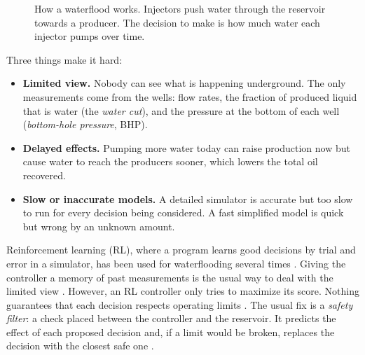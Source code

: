 \documentclass[11pt,letterpaper]{article}
\begin{document}
\begin{figure}[!htbp]
\caption[Conceptual waterflood]{How a waterflood works. Injectors push water through the reservoir towards a
producer. The decision to make is how much water each injector pumps over time.}
\label{fig:waterflood}
\end{figure}

Three things make it hard:
\begin{itemize}
\item \textbf{Limited view.} Nobody can see what is happening underground. The only
measurements come from the wells: flow rates, the fraction of produced liquid that is water
(the \emph{water cut}), and the pressure at the bottom of each well (\emph{bottom-hole
pressure}, BHP).
\item \textbf{Delayed effects.} Pumping more water today can raise production now but cause
water to reach the producers sooner, which lowers the total oil recovered.
\item \textbf{Slow or inaccurate models.} A detailed simulator is accurate but too slow to
run for every decision being considered. A fast simplified model is quick but wrong by an
unknown amount.
\end{itemize}

Reinforcement learning (RL), where a program learns good decisions by trial and error in a
simulator, has been used for waterflooding several times
\cite{hourfar2019rl,ma2019drl,zhang2022drl}. Giving the controller a memory of past
measurements is the usual way to deal with the limited view
\cite{kaelbling1998pomdp,hausknecht2015drqn}. However, an RL controller only tries to
maximize its score. Nothing guarantees that each decision respects operating limits
\cite{garcia2015survey}. The usual fix is a \emph{safety filter}: a check placed between
the controller and the reservoir. It predicts the effect of each proposed decision and, if
a limit would be broken, replaces the decision with the closest safe one
\cite{wabersich2021filter}.
\end{document}
